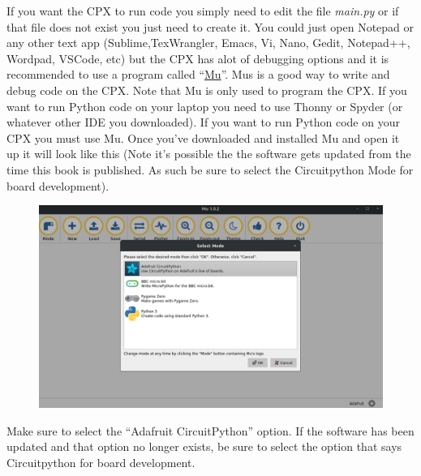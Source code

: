 If you want the CPX to run code you simply need to edit the file
{\it main.py} or if that file does not exist you just need to create it. You
could just open Notepad or any other text app (Sublime,TexWrangler,
Emacs, Vi, Nano, Gedit, Notepad++, Wordpad, VSCode, etc) but the CPX
has alot of debugging options and it is recommended to use a program
called “\href{https://codewith.mu/en/download}{Mu}”. Mus is a good way to write and debug code on the
CPX. Note that Mu is only used to program the CPX. If you want to run
Python code on your laptop you need to use Thonny or Spyder (or
whatever other IDE you downloaded). If you want to run Python code on
your CPX you must use Mu. Once you’ve downloaded and installed Mu and
open it up it will look like this (Note it's possible the the software
gets updated from the time this book is published. As such be sure to
select the Circuitpython Mode for board development).
\begin{figure}[H]
  \begin{center}
    \includegraphics[width=\textwidth]{Figures/Mu.png}
  \end{center}
\end{figure}
Make sure to select the “Adafruit CircuitPython” option. If the
software has been updated and that option no longer exists, be sure to
select the option that says Circuitpython for board development.


